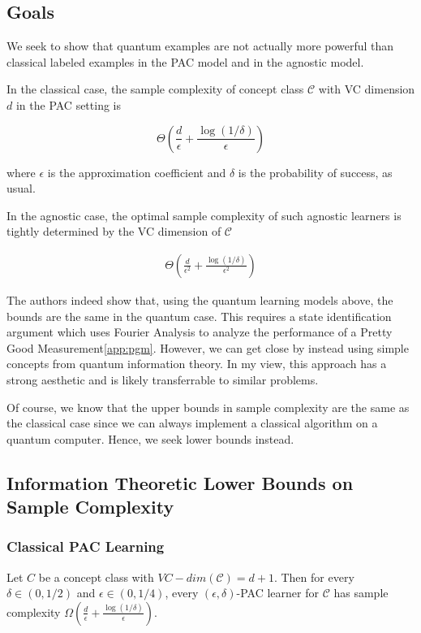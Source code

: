 \documentclass[main.tex]{subfiles}
\begin{document}
\subsection{Goals}

We seek to show that quantum examples are not actually more powerful than classical labeled examples in the PAC model and in the agnostic model.

In the classical case, the sample complexity of concept class $\mathcal{C}$ with VC dimension $d$ in the PAC setting is

$$
\Theta(\frac{d}{\epsilon} + \frac{\log(1/\delta)}{\epsilon})
$$

where $\epsilon$ is the approximation coefficient and $\delta$ is the probability of success, as usual.

In the agnostic case, the optimal sample complexity of such agnostic learners is tightly determined by the VC dimension of $\mathcal{C}$

\begin{align*}
\Theta(\frac{d}{\epsilon^2} + \frac{\log(1/\delta)}{\epsilon^2})
\end{align*}

The authors indeed show that, using the quantum learning models above, the bounds are the same in the quantum case. This requires a state identification argument which uses Fourier Analysis to analyze the performance of a Pretty Good Measurement\ref{app:pgm}. However, we can get close by instead using simple concepts from quantum information theory. In my view, this approach has a strong aesthetic and is likely transferrable to similar problems.

Of course, we know that the upper bounds in sample complexity are the same as the classical case since we can always implement a classical algorithm on a quantum computer. Hence, we seek lower bounds instead. 

\subsection{Information Theoretic Lower Bounds on Sample Complexity}

\subsubsection{Classical PAC Learning}

\begin{theorem}
Let $C$ be a concept class with $VC-dim(\mathcal{C}) = d + 1$. Then for every $\delta \in (0,1/2)$ and $\epsilon \in (0,1/4)$, every $(\epsilon,\delta)$-PAC learner for $\mathcal{C}$ has sample complexity $\Omega(\frac{d}{\epsilon} + \frac{\log(1/\delta)}{\epsilon})$.
\end{theorem}
\end{document}
